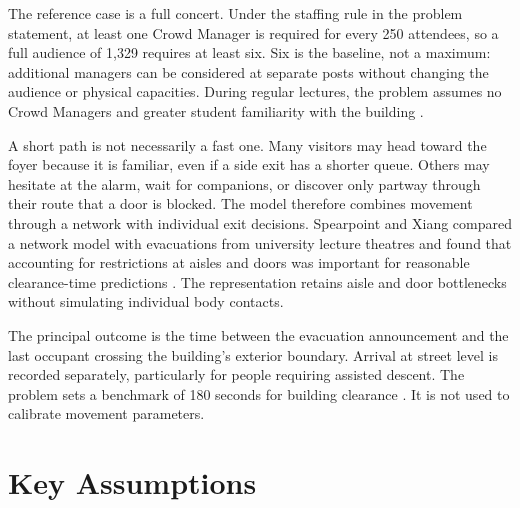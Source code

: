 \documentclass[11pt,a4paper]{article}
\begin{document}
The reference case is a full concert. Under the staffing rule in the problem statement, at least one Crowd Manager is required for every 250 attendees, so a full audience of 1,329 requires at least six. Six is the baseline, not a maximum: additional managers can be considered at separate posts without changing the audience or physical capacities. During regular lectures, the problem assumes no Crowd Managers and greater student familiarity with the building \cite{brief}.

A short path is not necessarily a fast one. Many visitors may head toward the foyer because it is familiar, even if a side exit has a shorter queue. Others may hesitate at the alarm, wait for companions, or discover only partway through their route that a door is blocked. The model therefore combines movement through a network with individual exit decisions. Spearpoint and Xiang compared a network model with evacuations from university lecture theatres and found that accounting for restrictions at aisles and doors was important for reasonable clearance-time predictions \cite{spearpoint}. The representation retains aisle and door bottlenecks without simulating individual body contacts.

The principal outcome is the time between the evacuation announcement and the last occupant crossing the building's exterior boundary. Arrival at street level is recorded separately, particularly for people requiring assisted descent. The problem sets a benchmark of 180 seconds for building clearance \cite{brief}. It is not used to calibrate movement parameters.

\section{Key Assumptions}
\end{document}
